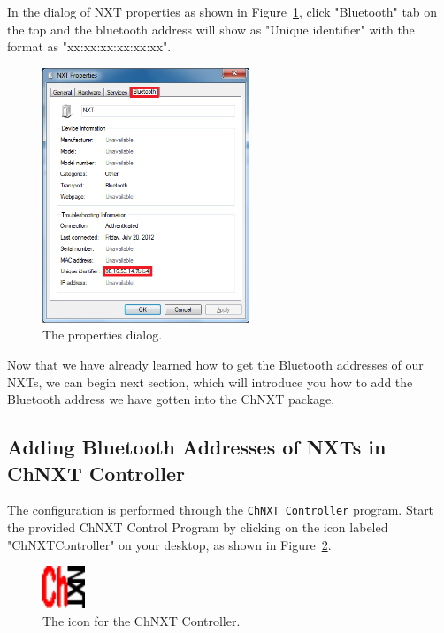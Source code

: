 \documentclass[11pt]{article}
\begin{document}
In the dialog of NXT properties as shown in Figure~\ref{fig:bt_property_dialog}, click "Bluetooth" tab on the
top and the bluetooth address will show as "Unique identifier" with the format as "xx:xx:xx:xx:xx:xx".

\begin{figure}[H]
  \begin{center}
    \includegraphics[height=3in]{figure/configuration/getBTaddress/btPropertiesDlg.png}
    \caption{The properties dialog.\label{fig:bt_property_dialog}}
  \end{center}
\end{figure}

Now that we have already learned how to get the Bluetooth addresses of our NXTs, we can begin next section, which
will introduce you how to add the Bluetooth address we have gotten into the ChNXT package.

\subsection{Adding Bluetooth Addresses of NXTs in ChNXT Controller}
The configuration is performed through the {\tt ChNXT Controller} program. Start the 
provided ChNXT Control Program by clicking on the icon labeled "ChNXTController" on your desktop,
as shown in Figure~\ref{fig:chnxt_icon}.

\begin{figure}[H]
  \begin{center}
    \includegraphics[height=0.5in]{figure/configuration/chnxt.png}
    \caption{The icon for the ChNXT Controller.\label{fig:chnxt_icon}}
  \end{center}
\end{figure}
\end{document}
